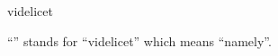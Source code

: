 \documentclass{stex}
\begin{document}
\begin{smodule}{videlicet}
\begin{sparagraph}[style=symdoc]
``'' stands for ``videlicet'' which means
``namely''.
\end{sparagraph}
\end{smodule}
\end{document}
